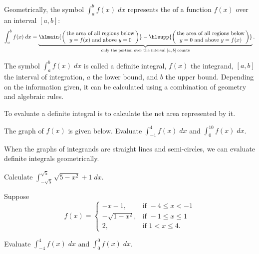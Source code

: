 \documentclass[../main.tex]{subfiles}
\begin{document}
\begin{definition} \label{def:definite-integral-net-area}
  Geometrically, the symbol \(\int_{a}^{b} f(x) \;dx\) represents the  of a function \(f(x)\) over an interval \([a,b]\):
  \[
    \int_{a}^{b} f(x) \;dx = \underbrace{\hlmain{\left(\parbox{1.75in}{\centering the area of all regions below \(y = f(x)\) and above \(y = 0\)}\right)} - \hlsupp{\left(\parbox{1.75in}{\centering the area of all regions below \(y = 0\) and above \(y = f(x)\)}\right)}}_{\text{only the portion over the interval \([a,b]\) counts}}.
  \]

  The symbol \(\int_{a}^{b} f(x) \;dx\) is called a definite integral, \(f(x)\) the integrand, \([a,b]\) the interval of integration, \(a\) the lower bound, and \(b\) the upper bound. Depending on the information given, it can be calculated using a combination of geometry and algebraic rules.

\end{definition}

\begin{center}
  
  \qquad
  
  \qquad
  
\end{center}

\faStar{} To evaluate a definite integral is to calculate the net area represented by it.

\begin{example} \label{ex:definite-integral-area}
  The graph of \(f(x)\) is given below. Evaluate \(\int_{-1}^{4} f(x) \;dx\) and \(\int_{0}^{10} f(x) \;dx\).

  

  \blanks*
\end{example}
\clearpage

When the graphs of integrands are straight lines and semi-circles, we can evaluate definite integrals geometrically.

\begin{example}
  Calculate \(\int_{-\sqrt{5}}^{\sqrt{5}} \sqrt{5 - x^{2}} + 1 \;dx\).

\end{example}

\begin{example} \label{ex:definite-integral-piecewise}
  Suppose
  \[
    f(x) =
    \begin{cases}
      -x - 1,            & \text{if } -4 \le x < -1 \\[1ex]
      -\sqrt{1 - x^{2}}, & \text{if } -1 \le x \le 1 \\[1ex]
      2,                 & \text{if } 1 < x \le 4.
    \end{cases}
  \]

  Evaluate \(\int_{-4}^{4} f(x) \;dx\) and \(\int_{0}^{0} f(x) \;dx\).

  \blanks*
\end{example}
\clearpage
\end{document}
